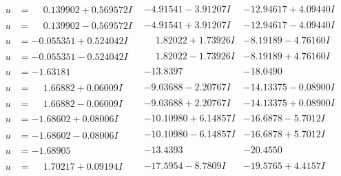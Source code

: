 \documentclass[1p]{elsarticle_modified}
\theoremstyle{definition}
\begin{document}
$$\begin{array}{c|c|c}
\begin{aligned}
u &= \phantom{-}0.139902 + 0.569572 I\end{aligned}
 & -4.91541 - 3.91207 I & -12.94617 + 4.09440 I \\ \hline\begin{aligned}
u &= \phantom{-}0.139902 - 0.569572 I\end{aligned}
 & -4.91541 + 3.91207 I & -12.94617 - 4.09440 I \\ \hline\begin{aligned}
u &= -0.055351 + 0.524042 I\end{aligned}
 & \phantom{-}1.82022 + 1.73926 I & -8.19189 - 4.76160 I \\ \hline\begin{aligned}
u &= -0.055351 - 0.524042 I\end{aligned}
 & \phantom{-}1.82022 - 1.73926 I & -8.19189 + 4.76160 I \\ \hline\begin{aligned}
u &= -1.63181\phantom{ +0.000000I}\end{aligned}
 & -13.8397\phantom{ +0.000000I} & -18.0490\phantom{ +0.000000I} \\ \hline\begin{aligned}
u &= \phantom{-}1.66882 + 0.06009 I\end{aligned}
 & -9.03688 - 2.20767 I & -14.13375 - 0.08900 I \\ \hline\begin{aligned}
u &= \phantom{-}1.66882 - 0.06009 I\end{aligned}
 & -9.03688 + 2.20767 I & -14.13375 + 0.08900 I \\ \hline\begin{aligned}
u &= -1.68602 + 0.08006 I\end{aligned}
 & -10.10980 + 6.14857 I & -16.6878 - 5.7012 I \\ \hline\begin{aligned}
u &= -1.68602 - 0.08006 I\end{aligned}
 & -10.10980 - 6.14857 I & -16.6878 + 5.7012 I \\ \hline\begin{aligned}
u &= -1.68905\phantom{ +0.000000I}\end{aligned}
 & -13.4393\phantom{ +0.000000I} & -20.4550\phantom{ +0.000000I} \\ \hline\begin{aligned}
u &= \phantom{-}1.70217 + 0.09194 I\end{aligned}
 & -17.5954 - 8.7809 I & -19.5765 + 4.4157 I \\ \hline\begin{aligned}

\end{aligned}
\end{array}$$
\end{document}
